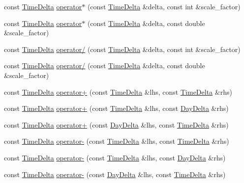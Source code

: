 \begin{DoxyCompactItemize}
\item 
const \hyperlink{structTimeDelta}{\-Time\-Delta} \hyperlink{structTimeDelta_ab7a91eba5b4f059a62b8514db14fc53b}{operator$\ast$} (const \hyperlink{structTimeDelta}{\-Time\-Delta} \&delta, const int \&scale\-\_\-factor)
\item 
const \hyperlink{structTimeDelta}{\-Time\-Delta} \hyperlink{structTimeDelta_adab5720acc96114e1dc60fee9e515cb8}{operator$\ast$} (const \hyperlink{structTimeDelta}{\-Time\-Delta} \&delta, const double \&scale\-\_\-factor)
\item 
const \hyperlink{structTimeDelta}{\-Time\-Delta} \hyperlink{structTimeDelta_ad9091904936708075238c1211784ac72}{operator/} (const \hyperlink{structTimeDelta}{\-Time\-Delta} \&delta, const int \&scale\-\_\-factor)
\item 
const \hyperlink{structTimeDelta}{\-Time\-Delta} \hyperlink{structTimeDelta_aa3ef692470498914c3a3da20f5689333}{operator/} (const \hyperlink{structTimeDelta}{\-Time\-Delta} \&delta, const double \&scale\-\_\-factor)
\item 
const \hyperlink{structTimeDelta}{\-Time\-Delta} \hyperlink{structTimeDelta_ab9dcf443fb6dde4d15657f270e5f1111}{operator+} (const \hyperlink{structTimeDelta}{\-Time\-Delta} \&lhs, const \hyperlink{structTimeDelta}{\-Time\-Delta} \&rhs)
\item 
const \hyperlink{structTimeDelta}{\-Time\-Delta} \hyperlink{structTimeDelta_a8f6bef028089b857d7d4a1e14ab81d9a}{operator+} (const \hyperlink{structTimeDelta}{\-Time\-Delta} \&lhs, const \hyperlink{structDayDelta}{\-Day\-Delta} \&rhs)
\item 
const \hyperlink{structTimeDelta}{\-Time\-Delta} \hyperlink{structTimeDelta_adfb48eb9c656f4705fa593c8b58bc80f}{operator+} (const \hyperlink{structDayDelta}{\-Day\-Delta} \&lhs, const \hyperlink{structTimeDelta}{\-Time\-Delta} \&rhs)
\item 
const \hyperlink{structTimeDelta}{\-Time\-Delta} \hyperlink{structTimeDelta_a0298dd60abe0bb412961af7325925999}{operator-\/} (const \hyperlink{structTimeDelta}{\-Time\-Delta} \&lhs, const \hyperlink{structTimeDelta}{\-Time\-Delta} \&rhs)
\item 
const \hyperlink{structTimeDelta}{\-Time\-Delta} \hyperlink{structTimeDelta_ab4c141e3692561a153127782bda9a9f8}{operator-\/} (const \hyperlink{structTimeDelta}{\-Time\-Delta} \&lhs, const \hyperlink{structDayDelta}{\-Day\-Delta} \&rhs)
\item 
const \hyperlink{structTimeDelta}{\-Time\-Delta} \hyperlink{structTimeDelta_afa45b09b5e63a55e656879efe36665d8}{operator-\/} (const \hyperlink{structDayDelta}{\-Day\-Delta} \&lhs, const \hyperlink{structTimeDelta}{\-Time\-Delta} \&rhs)

\end{DoxyCompactItemize}
